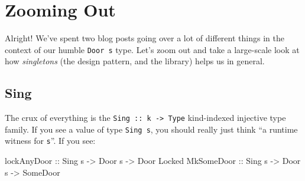 \documentclass[]{article}
\newenvironment{Shaded}{}{}
\newcommand{\CommentTok}[1]{\textcolor[rgb]{0.38,0.63,0.69}{\textit{#1}}}
\newcommand{\DataTypeTok}[1]{\textcolor[rgb]{0.56,0.13,0.00}{#1}}
\newcommand{\KeywordTok}[1]{\textcolor[rgb]{0.00,0.44,0.13}{\textbf{#1}}}
\newcommand{\NormalTok}[1]{#1}
\newcommand{\OperatorTok}[1]{\textcolor[rgb]{0.40,0.40,0.40}{#1}}
\newcommand{\OtherTok}[1]{\textcolor[rgb]{0.00,0.44,0.13}{#1}}
\begin{document}
\begin{Shaded}
\end{Shaded}

\hypertarget{zooming-out}{%
\section{Zooming Out}\label{zooming-out}}

Alright! We've spent two blog posts going over a lot of different things in the
context of our humble \texttt{Door\ s} type. Let's zoom out and take a
large-scale look at how \emph{singletons} (the design pattern, and the library)
helps us in general.

\hypertarget{sing}{%
\subsection{Sing}\label{sing}}

The crux of everything is the \texttt{Sing\ ::\ k\ -\textgreater{}\ Type}
kind-indexed injective type family. If you see a value of type \texttt{Sing\ s},
you should really just think ``a runtime witness for \texttt{s}''. If you see:

\begin{Shaded}
\begin{Highlighting}[]
\OtherTok{lockAnyDoor ::} \DataTypeTok{Sing}\NormalTok{ s }\OtherTok{{-}>} \DataTypeTok{Door}\NormalTok{ s }\OtherTok{{-}>} \DataTypeTok{Door} \DataTypeTok{\textquotesingle{}Locked}
\DataTypeTok{MkSomeDoor}\OtherTok{  ::} \DataTypeTok{Sing}\NormalTok{ s }\OtherTok{{-}>} \DataTypeTok{Door}\NormalTok{ s }\OtherTok{{-}>} \DataTypeTok{SomeDoor}
\end{Highlighting}
\end{Shaded}
\end{document}
